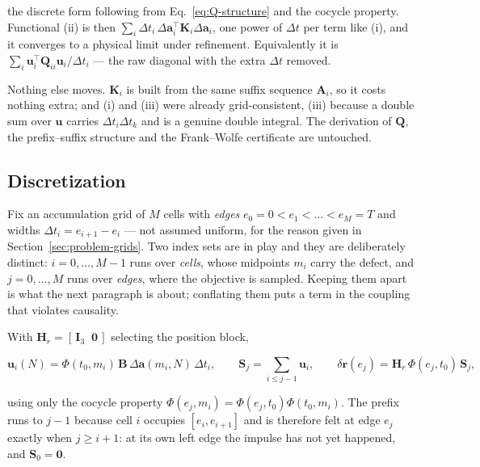 the discrete form following from Eq.~\eqref{eq:Q-structure} and the cocycle
property. Functional (ii) is then $\sum_i\Delta t_i\,
\Delta\mathbf a_i^{\top}\mathbf K_i\Delta\mathbf a_i$, one power of $\Delta t$
per term like (i), and it converges to a physical limit under refinement.
Equivalently it is $\sum_i \mathbf u_i^{\top}\mathbf Q_{ii}\mathbf u_i/\Delta t_i$
--- the raw diagonal with the extra $\Delta t$ removed.

Nothing else moves. $\mathbf K_i$ is built from the same suffix sequence
$\mathbf A_i$, so it costs nothing extra; and (i) and (iii) were already
grid-consistent, (iii) because a double sum over $\mathbf u$ carries
$\Delta t_i\Delta t_k$ and is a genuine double integral. The derivation of
$\mathbf Q$, the prefix--suffix structure and the Frank--Wolfe certificate are
untouched.

\subsection{Discretization}
\label{sec:problem-discretization}

Fix an accumulation grid of $M$ cells with \emph{edges}
$e_0=0<e_1<\dots<e_M=T$ and widths $\Delta t_i=e_{i+1}-e_i$ --- not assumed
uniform, for the reason given in Section~\ref{sec:problem-grids}. Two index
sets are in play and they are deliberately distinct: $i=0,\dots,M-1$ runs over
\emph{cells}, whose midpoints $m_i$ carry the defect, and $j=0,\dots,M$ runs
over \emph{edges}, where the objective is sampled. Keeping them apart is what
the next paragraph is about; conflating them puts a term in the coupling that
violates causality.

With $\mathbf H_r=[\,\mathbf I_3\;\;\mathbf 0\,]$ selecting the position block,

\begin{equation}
  \mathbf u_i(N) = \Phi(t_0,m_i)\,\mathbf B\,\Delta\mathbf a(m_i,N)\,
  \Delta t_i ,
  \qquad
  \mathbf S_j = \sum_{i\le j-1}\mathbf u_i,
  \qquad
  \delta\mathbf r(e_j) = \mathbf H_r\,\Phi(e_j,t_0)\,\mathbf S_j ,
  \label{eq:u-and-S}
\end{equation}

using only the cocycle property $\Phi(e_j,m_i)=\Phi(e_j,t_0)\Phi(t_0,m_i)$.
The prefix runs to $j-1$ because cell $i$ occupies $[e_i,e_{i+1}]$ and is
therefore felt at edge $e_j$ exactly when $j\ge i+1$: at its own left edge the
impulse has not yet happened, and $\mathbf S_0=\mathbf 0$.

